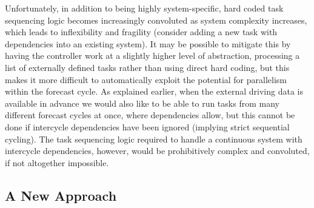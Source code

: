 \documentclass[11pt,a4paper]{article}
\begin{document}
Unfortunately, in addition to being highly system-specific, hard coded
task sequencing logic becomes increasingly convoluted as system
complexity increases, which leads to inflexibility and fragility
(consider adding a new task with dependencies into an existing system).
It may be possible to mitigate this by having the controller work at a
slightly higher level of abstraction, processing a list of externally
defined tasks rather than using direct hard coding, but this makes it
more difficult to automatically exploit the potential for parallelism
within the forecast cycle. As explained earlier, when the external
driving data is available in advance we would also like to be able to
run tasks from many different forecast cycles at once, where
dependencies allow, but this cannot be done if intercycle dependencies
have been ignored (implying strict sequential cycling). The task
sequencing logic required to handle a continuous system with intercycle
dependencies, however, would be prohibitively complex and convoluted, if
not altogether impossible.


\subsection{A New Approach} 
\end{document}
